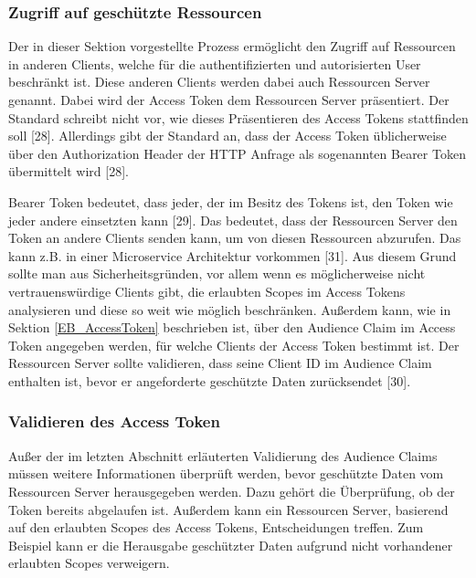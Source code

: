 
\subsubsection{Zugriff auf geschützte Ressourcen} \label{EB_Zugriff auf geschützte Ressourcen}

Der in dieser Sektion vorgestellte Prozess ermöglicht den Zugriff auf Ressourcen in anderen Clients, welche für die authentifizierten und autorisierten User beschränkt ist. Diese anderen Clients werden dabei auch Ressourcen Server genannt. Dabei wird der Access Token dem Ressourcen Server präsentiert. Der Standard schreibt nicht vor, wie dieses Präsentieren des Access Tokens stattfinden soll [28]. Allerdings gibt der Standard an, dass der Access Token üblicherweise über den Authorization Header der HTTP Anfrage als sogenannten Bearer Token übermittelt wird [28]. 

Bearer Token bedeutet, dass jeder, der im Besitz des Tokens ist, den Token wie jeder andere einsetzten kann [29]. Das bedeutet, dass der Ressourcen Server den Token an andere Clients senden kann, um von diesen Ressourcen abzurufen. Das kann z.B. in einer Microservice Architektur vorkommen [31]. Aus diesem Grund sollte man aus Sicherheitsgründen, vor allem wenn es möglicherweise nicht vertrauenswürdige Clients gibt, die erlaubten Scopes im Access Tokens analysieren und diese so weit wie möglich beschränken. Außerdem kann, wie in Sektion \ref{EB_AccessToken} beschrieben ist, über den Audience Claim im Access Token angegeben werden, für welche Clients der Access Token bestimmt ist. Der Ressourcen Server sollte validieren, dass seine Client ID im Audience Claim enthalten ist, bevor er angeforderte geschützte Daten zurücksendet [30].

\subsubsection{Validieren des Access Token}

Außer der im letzten Abschnitt erläuterten Validierung des Audience Claims müssen weitere Informationen überprüft werden, bevor geschützte Daten vom Ressourcen Server herausgegeben werden. Dazu gehört die Überprüfung, ob der Token bereits abgelaufen ist. Außerdem kann ein Ressourcen Server, basierend auf den erlaubten Scopes des Access Tokens, Entscheidungen treffen. Zum Beispiel kann er die Herausgabe geschützter Daten aufgrund nicht vorhandener erlaubten Scopes verweigern.


